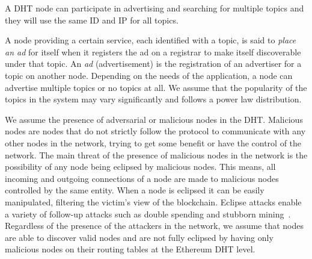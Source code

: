 A DHT node can participate in advertising and searching for multiple topics and they will use the same ID and IP for all topics.

A node providing a certain service,  each identified with a topic, is said to \emph{place an ad} for itself when it registers the ad on a registrar to make itself discoverable under that topic. 
An \emph{ad} (\ie advertisement) is the registration of an advertiser for a topic on another node. 
Depending on the needs of the application, a node can advertise multiple topics or no topics at all. 
We assume that the popularity of the topics in the system may vary significantly and follows a power law distribution. 


We assume the presence of adversarial or malicious nodes in the DHT. 
Malicious nodes are nodes that do not strictly follow the protocol to communicate with any other nodes in the network,  trying to get some benefit or have the control of the network.
The main threat of the presence of malicious nodes in the network is the possibility of any node being eclipsed by malicious nodes.
This means,  all incoming and outgoing connections of a node are made to malicious nodes controlled by the same entity. 
When a node is eclipsed it can be easily manipulated,
filtering the victim’s view of the blockchain.  
Eclipse attacks
enable a variety of follow-up attacks such as double spending
and stubborn mining~\cite{stubborn}.
Regardless of the presence of the attackers in the network, 
we assume that nodes are able to discover valid nodes and are not fully eclipsed by having only malicious nodes on their routing tables at the Ethereum DHT level.
%

